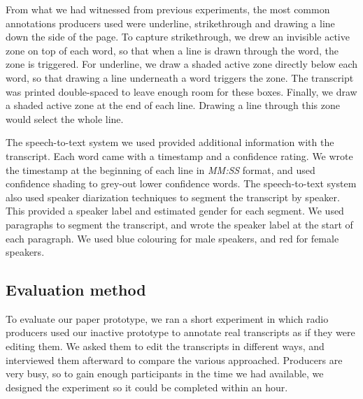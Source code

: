 From what we had witnessed from previous experiments, the most common annotations producers used were underline,
strikethrough and drawing a line down the side of the page.  To capture strikethrough, we drew an invisible active zone
on top of each word, so that when a line is drawn through the word, the zone is triggered. For underline, we draw a
shaded active zone directly below each word, so that drawing a line underneath a word triggers the zone. The transcript
was printed double-spaced to leave enough room for these boxes. Finally, we draw a shaded active zone at the end of
each line. Drawing a line through this zone would select the whole line.

The speech-to-text system we used provided additional information with the transcript.  Each word came with a timestamp
and a confidence rating. We wrote the timestamp at the beginning of each line in \textit{MM:SS} format, and used
confidence shading to grey-out lower confidence words.  The speech-to-text system also used speaker diarization
techniques to segment the transcript by speaker. This provided a speaker label and estimated gender for each segment.
We used paragraphs to segment the transcript, and wrote the speaker label at the start of each paragraph. We used blue
colouring for male speakers, and red for female speakers.

\subsection{Evaluation method}




To evaluate our paper prototype, we ran a short experiment in which radio producers used our inactive prototype to
annotate real transcripts as if they were editing them.  We asked them to edit the transcripts in different ways, and
interviewed them afterward to compare the various approached. Producers are very busy, so to gain enough participants
in the time we had available, we designed the experiment so it could be completed within an hour.

